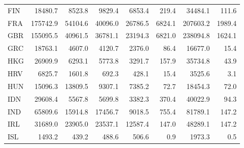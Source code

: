 \documentclass[a4paper,11pt]{article}
\begin{document}
\begin{table}[h]
\begin{tabular}{lrrrrrrr}
    FIN   & 18480.7 & 8523.8 & 9829.4 & 6853.4 & 219.4 & 34484.1 & 111.6 \\
    FRA   & 175742.9 & 54104.6 & 40096.0 & 26786.5 & 6824.1 & 207603.2 & 1989.4 \\
    GBR   & 155095.5 & 40961.5 & 36781.1 & 23194.3 & 6821.0 & 238094.8 & 1624.1 \\
    GRC   & 18763.1 & 4607.0 & 4120.7 & 2376.0 & 86.4  & 16677.0 & 15.4 \\
    HKG   & 26909.9 & 6293.1 & 5773.8 & 3291.7 & 157.9 & 35734.8 & 43.9 \\
    HRV   & 6825.7 & 1601.8 & 692.3 & 428.1 & 15.4  & 3525.6 & 3.1 \\
    HUN   & 15096.3 & 13809.5 & 9307.1 & 7385.2 & 72.7  & 18454.3 & 72.0 \\
    IDN   & 29608.4 & 5567.8 & 5699.8 & 3382.3 & 370.4 & 40022.9 & 94.3 \\
    IND   & 65809.6 & 15914.8 & 17456.7 & 9018.5 & 755.4 & 81789.1 & 147.2 \\
    IRL   & 31689.0 & 23905.0 & 23537.1 & 12587.4 & 147.0 & 48289.1 & 147.2 \\
    ISL   & 1493.2 & 439.2 & 488.6 & 506.6 & 0.9   & 1973.3 & 0.5 \\
	\end{tabular}
\end{table}
\end{document}
